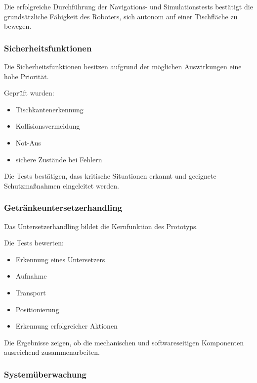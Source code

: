 \documentclass[
  a4paper,
  12pt,
  DIV=12,        %
  parskip=half,  %
  headings=small %
]{scrartcl}
\theoremstyle{definition}
\providecommand{\tightlist}{%
  \setlength{\itemsep}{0pt}\setlength{\parskip}{0pt}}
\theoremstyle{definition}
\begin{document}
Die erfolgreiche Durchführung der Navigations- und Simulationstests
bestätigt die grundsätzliche Fähigkeit des Roboters, sich autonom auf
einer Tischfläche zu bewegen.

\subsubsection{Sicherheitsfunktionen}\label{sicherheitsfunktionen}

Die Sicherheitsfunktionen besitzen aufgrund der möglichen Auswirkungen
eine hohe Priorität.

Geprüft wurden:

\begin{itemize}
\tightlist
\item
  Tischkantenerkennung
\item
  Kollisionsvermeidung
\item
  Not-Aus
\item
  sichere Zustände bei Fehlern
\end{itemize}

Die Tests bestätigen, dass kritische Situationen erkannt und geeignete
Schutzmaßnahmen eingeleitet werden.

\subsubsection{Getränkeuntersetzerhandling}\label{getruxe4nkeuntersetzerhandling}

Das Untersetzerhandling bildet die Kernfunktion des Prototyps.

Die Tests bewerten:

\begin{itemize}
\tightlist
\item
  Erkennung eines Untersetzers
\item
  Aufnahme
\item
  Transport
\item
  Positionierung
\item
  Erkennung erfolgreicher Aktionen
\end{itemize}

Die Ergebnisse zeigen, ob die mechanischen und softwareseitigen
Komponenten ausreichend zusammenarbeiten.

\subsubsection{Systemüberwachung}\label{systemuxfcberwachung}
\end{document}
